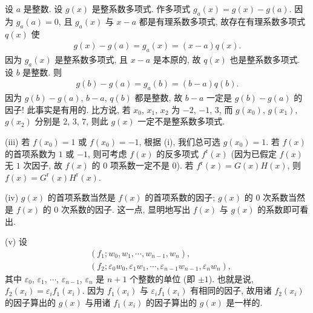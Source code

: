 \begin{remark}
    设 $a$ 是整数. 设 $g(x)$ 是整系数多项式. 作多项式 $g_a (x) = g(x) - g(a)$. 因为 $g_a (a) = 0$, 且 $g_a (x)$ 与 $x-a$ 都是有理系数多项式, 故存在有理系数多项式 $q(x)$ 使
    \begin{align*}
        g(x) - g(a) = g_a (x) = (x - a) q(x).
    \end{align*}
    因为 $g_a (x)$ 是整系数多项式, 且 $x - a$ 是本原的, 故 $q(x)$ 也是整系数多项式. 设 $b$ 是整数. 则
    \begin{align*}
        g(b) - g(a) = g_a (b) = (b - a) q(b).
    \end{align*}
    因为 $g(b) - g(a)$, $b - a$, $q(b)$ 都是整数, 故 $b - a$ 一定是 $g(b) - g(a)$ 的因子! 此事实是有用的. 比方说, 若 $x_0$, $x_1$, $x_2$ 为 $-2$, $-1$, $3$, 而 $g(x_0)$, $g(x_1)$, $g(x_2)$ 分别是 $2$, $3$, $7$, 则此 $g(x)$ 一定不是整系数多项式.

    (iii) 若 $f(x_0) = 1$ 或 $f(x_0) = -1$, 根据 (i), 我们总可选 $g(x_0) = 1$. 若 $f(x)$ 的首项系数为 $1$ 或 $-1$, 则可考虑 $f(x)$ 的反多项式 $f^{\mathrm{r}} (x)$ (因为已假定 $f(x)$ 无 $1$ 次因子, 故 $f(x)$ 的 $0$ 项系数一定不是 $0$). 若 $f^{\mathrm{r}} (x) = G(x) H(x)$, 则 $f(x) = G^{\mathrm{r}}(x) H^{\mathrm{r}}(x)$.

    (iv) $g(x)$ 的首项系数当然是 $f(x)$ 的首项系数的因子; $g(x)$ 的 $0$ 次系数当然是 $f(x)$ 的 $0$ 次系数的因子. 这一点, 显明地写出 $f(x)$ 与 $g(x)$ 的系数即可看出.

    (v) 设
    \begin{align*}
         & (f_1; w_0, w_1, \cdots, w_{n-1}, w_n),                                                             \\
         & (f_2; \varepsilon_0 w_0, \varepsilon_1 w_1, \cdots, \varepsilon_{n-1} w_{n-1}, \varepsilon_n w_n),
    \end{align*}
    其中 $\varepsilon_0$, $\varepsilon_1$, $\cdots$, $\varepsilon_{n-1}$, $\varepsilon_n$ 是 $n+1$ 个整数的单位 (即 $\pm 1$). 也就是说, $f_2 (x_i) = \varepsilon_i f_1 (x_i)$. 因为 $f_1 (x_i)$ 与 $\varepsilon_i f_1 (x_i)$ 有相同的因子, 故用诸 $f_2 (x_i)$ 的因子算出的 $g(x)$ 与用诸 $f_1 (x_i)$ 的因子算出的 $g(x)$ 是一样的.
\end{remark}

